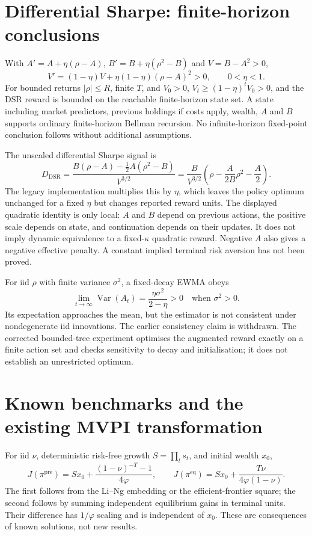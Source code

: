 \documentclass[11pt,a4paper]{article}
\theoremstyle{plain}
\theoremstyle{definition}
\theoremstyle{remark}
\newcommand{\Var}{\operatorname{Var}}
\newcommand{\pipre}{\pi^{\mathrm{pre}}}
\newcommand{\pieq}{\pi^{\mathrm{eq}}}
\begin{document}
\ifdim\dimexpr\pagegoal-\pagetotal\relax<120pt\newpage\fi
\section{Differential Sharpe: finite-horizon conclusions}
\label{app:dsr}
With $A'=A+\eta(\rho-A)$, $B'=B+\eta(\rho^2-B)$ and $V=B-A^2>0$,
\begin{equation}
 V'=(1-\eta)V+\eta(1-\eta)(\rho-A)^2>0,\qquad0<\eta<1.
\end{equation}
For bounded returns $|\rho|\le R$, finite $T$, and $V_0>0$,
$V_t\ge(1-\eta)^tV_0>0$, and the DSR reward is bounded on the reachable
finite-horizon state set. A state including market predictors, previous holdings
if costs apply, wealth, $A$ and $B$ supports ordinary finite-horizon Bellman
recursion. No infinite-horizon fixed-point conclusion follows without additional assumptions.

The unscaled differential Sharpe signal is
\[
 D_{\mathrm{DSR}}
 =\frac{B(\rho-A)-\tfrac12 A(\rho^2-B)}{V^{3/2}}
 =\frac{B}{V^{3/2}}\left(\rho-\frac{A}{2B}\rho^2-\frac A2\right).
\]
The legacy implementation multiplies this by $\eta$, which leaves the policy
optimum unchanged for a fixed $\eta$ but changes reported reward units.
The displayed quadratic identity is only local: $A$ and $B$ depend on previous
actions, the positive scale depends on state, and continuation depends on their
updates. It does not imply dynamic equivalence to a fixed-$\kappa$ quadratic
reward. Negative $A$ also gives a negative effective penalty. A constant implied
terminal risk aversion has not been proved.

For iid $\rho$ with finite variance $\sigma^2$, a fixed-decay EWMA obeys
\[
 \lim_{t\to\infty}\Var(A_t)=\frac{\eta\sigma^2}{2-\eta}>0
 \quad\text{when }\sigma^2>0.
\]
Its expectation approaches the mean, but the estimator is not consistent under
nondegenerate iid innovations. The earlier consistency claim is withdrawn.
The corrected bounded-tree experiment optimises the augmented reward exactly
on a finite action set and checks sensitivity to decay and initialisation;
it does not establish an unrestricted optimum.

\ifdim\dimexpr\pagegoal-\pagetotal\relax<120pt\newpage\fi
\section{Known benchmarks and the existing MVPI transformation}
\label{app:mvpi}
For iid $\nu$, deterministic risk-free growth $S=\prod_ts_t$, and initial
wealth $x_0$,
\begin{equation}
 J(\pipre)=Sx_0+\frac{(1-\nu)^{-T}-1}{4\varphi},\qquad
 J(\pieq)=Sx_0+\frac{T\nu}{4\varphi(1-\nu)}.
\end{equation}
The first follows from the Li--Ng embedding or the efficient-frontier square;
the second follows by summing independent equilibrium gains in terminal units.
Their difference has $1/\varphi$ scaling and is independent of $x_0$. These are
consequences of known solutions, not new results.
\end{document}
